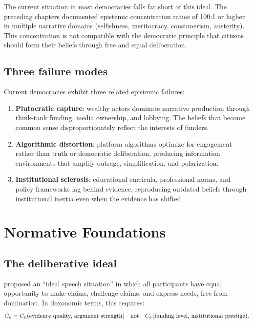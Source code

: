 The current situation in most democracies falls far short of this ideal.
The preceding chapters documented epistemic concentration ratios of 100:1 or higher in multiple narrative domains (selfishness, meritocracy, consumerism, austerity).
This concentration is not compatible with the democratic principle that citizens should form their beliefs through free and equal deliberation.

\subsection{Three failure modes}

Current democracies exhibit three related epistemic failures:

\begin{enumerate}
  \item \textbf{Plutocratic capture}: wealthy actors dominate narrative production through think-tank funding, media ownership, and lobbying.
  The beliefs that become common sense disproportionately reflect the interests of funders.

  \item \textbf{Algorithmic distortion}: platform algorithms optimize for engagement rather than truth or democratic deliberation, producing information environments that amplify outrage, simplification, and polarization.

  \item \textbf{Institutional sclerosis}: educational curricula, professional norms, and policy frameworks lag behind evidence, reproducing outdated beliefs through institutional inertia even when the evidence has shifted.
\end{enumerate}

\section{Normative Foundations}
\label{sec:ch32-normative}

\subsection{The deliberative ideal}

\textcite{habermas1962} proposed an ``ideal speech situation'' in which all participants have equal opportunity to make claims, challenge claims, and express needs, free from domination.
In doxonomic terms, this requires:
\[
  C_{k} = C_{k}(\text{evidence quality, argument strength}) \quad \text{not} \quad C_{k}(\text{funding level, institutional prestige}).
\]

